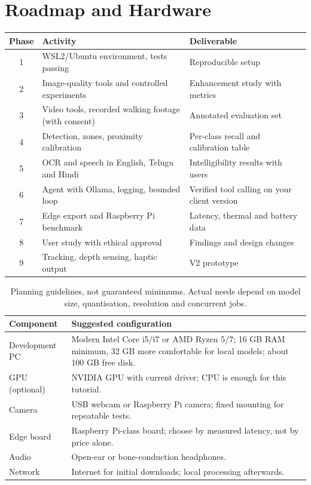 \chapter{Roadmap and Hardware}
\begin{table}[ht]\centering\small
\begin{tabular}{@{}clp{8cm}@{}}\toprule
\textbf{Phase} & \textbf{Activity} & \textbf{Deliverable}\\\midrule
1 & WSL2/Ubuntu environment, tests passing & Reproducible setup\\
2 & Image-quality tools and controlled experiments & Enhancement study with metrics\\
3 & Video tools, recorded walking footage (with consent) & Annotated evaluation set\\
4 & Detection, zones, proximity calibration & Per-class recall and calibration table\\
5 & OCR and speech in English, Telugu and Hindi & Intelligibility results with users\\
6 & Agent with Ollama, logging, bounded loop & Verified tool calling on your client version\\
7 & Edge export and Raspberry Pi benchmark & Latency, thermal and battery data\\
8 & User study with ethical approval & Findings and design changes\\
9 & Tracking, depth sensing, haptic output & V2 prototype\\
\bottomrule\end{tabular}
\end{table}

\begin{table}[ht]\centering\small
\begin{tabular}{@{}p{3.3cm}p{11.4cm}@{}}\toprule
\textbf{Component} & \textbf{Suggested configuration}\\\midrule
Development PC & Modern Intel Core i5/i7 or AMD Ryzen 5/7; 16 GB RAM minimum, 32 GB more comfortable for local models; about 100 GB free disk.\\
GPU (optional) & NVIDIA GPU with current driver; CPU is enough for this tutorial.\\
Camera & USB webcam or Raspberry Pi camera; fixed mounting for repeatable tests.\\
Edge board & Raspberry Pi-class board; choose by measured latency, not by price alone.\\
Audio & Open-ear or bone-conduction headphones.\\
Network & Internet for initial downloads; local processing afterwards.\\
\bottomrule\end{tabular}
\caption{Planning guidelines, not guaranteed minimums. Actual needs depend on model size, quantisation, resolution and concurrent jobs.}
\end{table}

